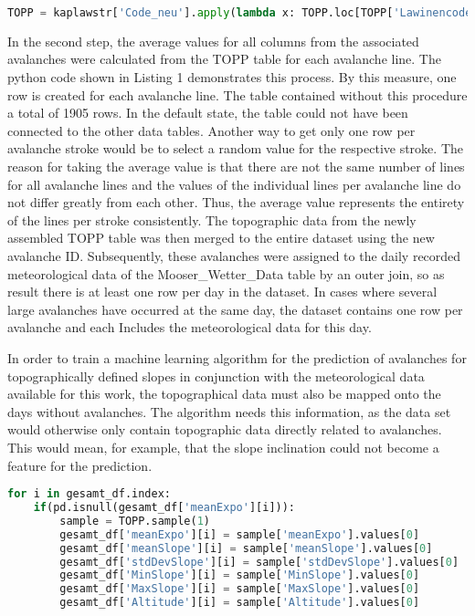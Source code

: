 \documentclass[12pt,a4paper]{article}
\begin{document}
\begin{lstlisting}[language=Python, caption=calculation of TOPP data for every avalanche line]
TOPP = kaplawstr['Code_neu'].apply(lambda x: TOPP.loc[TOPP['Lawinencode'] == x].mean())
\end{lstlisting} 


In the second step, the average values for all columns from the associated avalanches were calculated from the TOPP table for each avalanche line. The python code shown in Listing 1 demonstrates this process. By this measure, one row is created for each avalanche line. The table contained without this procedure a total of 1905 rows. In the default state, the table could not have been connected to the other data tables. Another way to get only one row per avalanche stroke would be to select a random value for the respective stroke. The reason for taking the average value is that there are not the same number of lines for all avalanche lines and the values of the individual lines per avalanche line do not differ greatly from each other. Thus, the average value represents the entirety of the lines per stroke consistently. The topographic data from the newly assembled TOPP table was then merged to the entire dataset using the new avalanche ID.
Subsequently, these avalanches were assigned to the daily recorded meteorological data of the Mooser\_Wetter\_Data table by an outer join, so as result there is at least one row per day in the dataset. In cases where several large avalanches have occurred at the same day, the dataset contains one row per avalanche and each Includes the meteorological data for this day. 

In order to train a machine learning algorithm for the prediction of avalanches for topographically defined slopes in conjunction with the meteorological data available for this work, the topographical data must also be mapped onto the days without avalanches. The algorithm needs this information, as the data set would otherwise only contain topographic data directly related to avalanches. This would mean, for example, that the slope inclination could not become a feature for the prediction.

\begin{lstlisting}[language=Python, caption=mapping random sample lines of topographical data onto the rows of non avalanche days]
for i in gesamt_df.index:
    if(pd.isnull(gesamt_df['meanExpo'][i])):
        sample = TOPP.sample(1)
        gesamt_df['meanExpo'][i] = sample['meanExpo'].values[0]
        gesamt_df['meanSlope'][i] = sample['meanSlope'].values[0]
        gesamt_df['stdDevSlope'][i] = sample['stdDevSlope'].values[0]
        gesamt_df['MinSlope'][i] = sample['MinSlope'].values[0]
        gesamt_df['MaxSlope'][i] = sample['MaxSlope'].values[0]
        gesamt_df['Altitude'][i] = sample['Altitude'].values[0]
\end{lstlisting}
 
\end{document}

